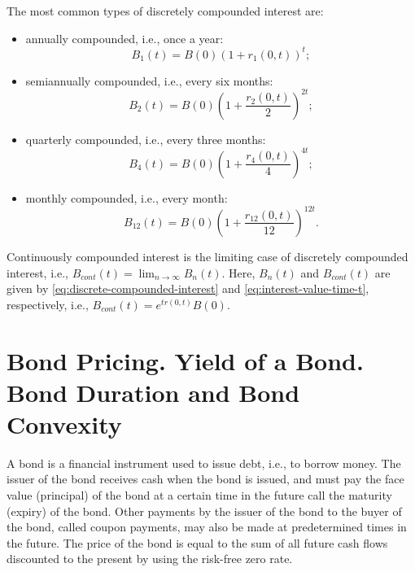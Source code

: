 The most common types of discretely compounded interest are:
\begin{itemize}
    \item annually compounded, i.e., once a year:
        \begin{equation*}
            B_1(t) = B(0) (1 + r_1(0, t))^t;
        \end{equation*}
    \item semiannually compounded, i.e., every six months:
        \begin{equation*}
            B_2(t) = B(0) \left( 1 + \frac{r_2(0, t)}{2} \right)^{2t};
        \end{equation*}
    \item quarterly compounded, i.e., every three months:
        \begin{equation*}
            B_4(t) = B(0) \left( 1 + \frac{r_4(0, t)}{4} \right)^{4t};
        \end{equation*}
    \item monthly compounded, i.e., every month:
        \begin{equation*}
            B_{12}(t) = B(0) \left( 1 + \frac{r_{12}(0, t)}{12} \right)^{12t}.
        \end{equation*}
\end{itemize}

Continuously compounded interest is the limiting case of discretely compounded
    interest, i.e., $ B_{cont} (t) = \lim_{n \rightarrow \infty} B_n(t) $.
Here, $ B_n(t) $ and $ B_{cont}(t) $ are given by
    \eqref{eq:discrete-compounded-interest} and
    \eqref{eq:interest-value-time-t}, respectively, i.e.,
    $ B_{cont}(t) = e^{tr(0, t)} B(0) $.

\section{Bond Pricing. Yield of a Bond. Bond Duration and Bond Convexity}
A bond is a financial instrument used to issue debt, i.e., to borrow money.
The issuer of the bond receives cash when the bond is issued, and must pay the
    face value (principal) of the bond at a certain time in the future call the
    maturity (expiry) of the bond.
Other payments by the issuer of the bond to the buyer of the bond, called coupon
    payments, may also be made at predetermined times in the future.
The price of the bond is equal to the sum of all future cash flows discounted to
    the present by using the risk-free zero rate.

